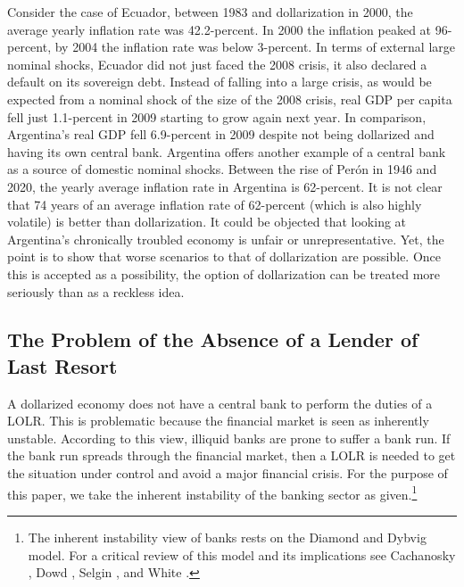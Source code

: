 \documentclass[12pt]{article}
\begin{document}
Consider the case of Ecuador, between 1983 and dollarization in 2000, the average yearly inflation rate was 42.2-percent. In 2000 the inflation peaked at 96-percent, by 2004 the inflation rate was below 3-percent. In terms of external large nominal shocks, Ecuador did not just faced the 2008 crisis, it also declared a default on its sovereign debt. Instead of falling into a large crisis, as would be expected from a nominal shock of the size of the 2008 crisis, real GDP per capita fell just 1.1-percent in 2009 starting to grow again next year. In comparison, Argentina's real GDP fell 6.9-percent in 2009 despite not being dollarized and having its own central bank. Argentina offers another example of a central bank as a source of domestic nominal shocks. Between the rise of Perón in 1946 and 2020, the yearly average inflation rate in Argentina is 62-percent. It is not clear that 74 years of an average inflation rate of 62-percent (which is also highly volatile) is better than dollarization. It could be objected that looking at Argentina's chronically troubled economy is unfair or unrepresentative. Yet, the point is to show that worse scenarios to that of dollarization are possible. Once this is accepted as a possibility, the option of dollarization can be treated more seriously than as a reckless idea.


\subsection{The Problem of the Absence of a Lender of Last Resort}

A dollarized economy does not have a central bank to perform the duties of a LOLR. This is problematic because the financial market is seen as inherently unstable. According to this view, illiquid banks are prone to suffer a bank run. If the bank run spreads through the financial market, then a LOLR is needed to get the situation under control and avoid a major financial crisis. For the purpose of this paper, we take the inherent instability of the banking sector as given.\footnote{The inherent instability view of banks rests on the Diamond and Dybvig \parencite*{Diamond1983} model. For a critical review of this model and its implications see Cachanosky \parencite*[][Ch. 1]{Cachanosky2018a}, Dowd \parencite*{Dowd1992a}, Selgin \parencite*[][Ch. 11]{Selgin1996c}, and White \parencite*[][Ch. 6]{White1999c}.}
\end{document}
